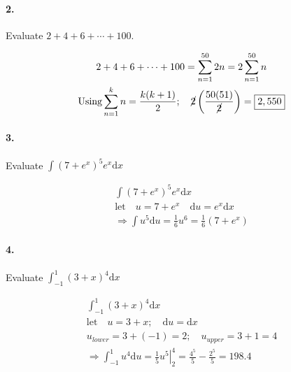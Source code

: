     \paragraph*{2.}
    Evaluate $2+4+6+\cdots+100$.

    \begin{mdframed}
        \begin{equation*}
            \begin{gathered}
                2+4+6+\cdots+100 = \sum_{n=1}^{50}2n = 2\sum_{n=1}^{50}n    \\
                \text{Using} \sum_{n=1}^{k}n = \frac{k(k+1)}{2}; \quad \cancel{2}\left(\frac{50(51)}{\cancel{2}}\right) = \boxed{2,550}
            \end{gathered}
        \end{equation*}
    \end{mdframed}

    \paragraph*{3.}
    Evaluate $\displaystyle\int(7+e^x)^5 e^x \mathrm{d}x$

    \begin{mdframed}
        \begin{equation*}
            \begin{gathered}
                \int(7+e^x)^5 e^x \mathrm{d}x                                   \\
                \text{let} \quad u = 7 + e^x \quad \mathrm{d}u = e^x\mathrm{d}x \\
                \Rightarrow\int u^5\mathrm{d}u = \frac{1}{6}u^6 = \boxed{\frac{1}{6}(7 + e^x)}
            \end{gathered}
        \end{equation*}
    \end{mdframed}

    \paragraph*{4.}
    Evaluate $\displaystyle\int_{-1}^{1}(3+x)^4 \mathrm{d}x$

    \begin{mdframed}
        \begin{equation*}
            \begin{gathered}
                \int_{-1}^{1}(3+x)^4 \mathrm{d}x                                \\
                \text{let} \quad u = 3 + x; \quad \mathrm{d}u = \mathrm{d}x     \\
                u_{lower} = 3 + (-1) = 2; \quad u_{upper} = 3 + 1 = 4                  \\
                \Rightarrow\int_{-1}^{1}u^4 \mathrm{d}u = \left.\frac{1}{5}u^5 \right|_{2}^{4}= \frac{4^5}{5} - \frac{2^5}{5} = \boxed{198.4}
            \end{gathered}
        \end{equation*}
    \end{mdframed}

